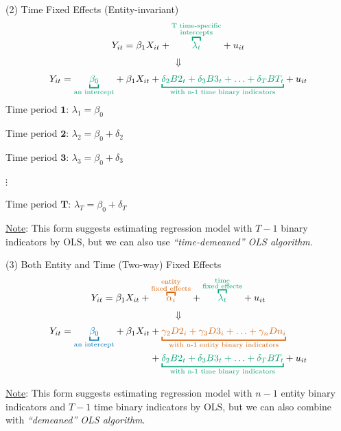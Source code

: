 \documentclass[
  10pt,
  ignorenonframetext,
]{beamer}
\begin{document}
\begin{frame}{(2) Time Fixed Effects (Entity-invariant)}
\protect\hypertarget{TimeFEs}{}
\[
Y_{it} = \beta_1 X_{it} + {\color{green}{\overbracket{\lambda_t}^{\substack{\text{T time-specific}\\ \text{intercepts}}}}} + u_{it}
\] \[\Downarrow\] \[
Y_{it} = {\color{green}{\underbracket{\beta_0}_{\text{an intercept}}}} + \beta_1 X_{it} + {\color{green}{\underbracket{\delta_2 B2_t + \delta_3 B3_t + \ldots + \delta_T BT_t}_{\text{with n-1 time binary indicators}}}} + u_{it}
\] Time period \(\mathbf{1}\): \(\lambda_1 = \beta_0\)

Time period \(\mathbf{2}\): \(\lambda_2 = \beta_0 + \delta_2\)

Time period \(\mathbf{3}\): \(\lambda_3 = \beta_0 + \delta_3\)

\(\vdots\)

Time period \(\mathbf{T}\): \(\lambda_T = \beta_0 + \delta_T\)

\footnotesize \underline{Note}: This form suggests estimating regression
model with \(T-1\) binary indicators by OLS, but we can also use
\emph{``time-demeaned'' OLS algorithm}.
\end{frame}

\begin{frame}{(3) Both Entity and Time (Two-way) Fixed Effects}
\protect\hypertarget{BothFEs}{}
\[
Y_{it} = \beta_1 X_{it} + {\color{red}{\overbracket{\alpha_i}^{\substack{\text{entity}\\ \text{fixed effects}}}}} + {\color{green}{\overbracket{\lambda_t}^{\substack{\text{time}\\ \text{fixed effects}}}}} + u_{it}
\] \[\Downarrow\] \[
\begin{aligned}
Y_{it} = {\color{blue}{\underbracket{\beta_0}_{\text{an intercept}}}} + \beta_1 X_{it} 
&+ {\color{red}{\underbracket{\gamma_2 D2_i + \gamma_3 D3_i + \ldots + \gamma_n Dn_i}_{\text{with n-1 entity binary indicators}}}} \\
&+ {\color{green}{\underbracket{\delta_2 B2_t + \delta_3 B3_t + \ldots + \delta_T BT_t}_{\text{with n-1 time binary indicators}}}}
+  u_{it}
\end{aligned}
\]

\vspace{3mm}

\footnotesize \underline{Note}: This form suggests estimating regression
model with \(n-1\) entity binary indicators and \(T-1\) time binary
indicators by OLS, but we can also combine with \emph{``demeaned'' OLS
algorithm}.
\end{frame}
\end{document}
